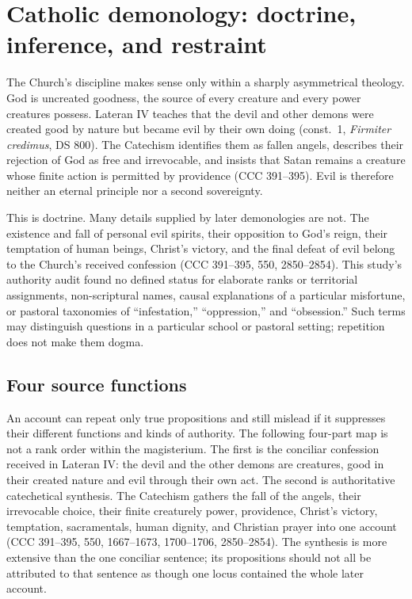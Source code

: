 \section{Catholic demonology: doctrine, inference, and restraint}

The Church's discipline makes sense only within a sharply asymmetrical
theology. God is uncreated goodness, the source of every creature and every
power creatures possess. Lateran IV teaches that the devil and other demons
were created good by nature but became evil by their own doing (const.~1,
\emph{Firmiter credimus}, DS 800). The Catechism identifies them as fallen
angels, describes their rejection of God as free and irrevocable, and insists
that Satan remains a creature whose finite action is permitted by providence
(CCC 391--395). Evil is therefore neither an eternal principle nor a second
sovereignty.

This is doctrine. Many details supplied by later demonologies are not. The
existence and fall of personal evil spirits, their opposition to God's reign,
their temptation of human beings, Christ's victory, and the final defeat of
evil belong to the Church's received confession (CCC 391--395, 550,
2850--2854). This study's authority audit found no defined status for elaborate
ranks or territorial assignments, non-scriptural names, causal explanations of
a particular misfortune, or pastoral taxonomies of ``infestation,''
``oppression,'' and ``obsession.'' Such terms may distinguish questions in a
particular school or pastoral setting; repetition does not make them dogma.

\subsection{Four source functions}

An account can repeat only true propositions and still mislead if it suppresses
their different functions and kinds of authority. The following four-part map
is not a rank order within the magisterium.
The first is the conciliar confession received in Lateran IV: the devil and
the other demons are creatures, good in their created nature and evil through
their own act. The second is authoritative catechetical synthesis. The
Catechism gathers the fall of the angels, their irrevocable choice, their
finite creaturely power, providence, Christ's victory, temptation, sacramentals,
human dignity, and Christian prayer into one account (CCC 391--395, 550,
1667--1673, 1700--1706, 2850--2854). The synthesis is more extensive than the
one conciliar sentence;
its propositions should not all be attributed to that sentence as though one
locus contained the whole later account.

